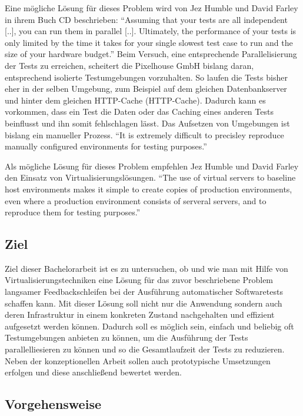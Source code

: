 Eine mögliche Lösung für dieses Problem wird von Jez Humble und David Farley in ihrem Buch \ac{CD} beschrieben: "`Assuming that your tests are all independent [..], you can run them in parallel [..]. Ultimately, the performance of your tests is only limited by the time it takes for your single slowest test case to run and the size of your hardware budget."' \citep[S.][S. 310]{HumFar10} Beim Versuch, eine entsprechende Parallelisierung der Tests zu erreichen, scheitert die Pixelhouse GmbH bislang daran, entsprechend isolierte Testumgebungen vorzuhalten. So laufen die Tests bisher eher in der selben Umgebung, zum Beispiel auf dem gleichen Datenbankserver und hinter dem gleichen HTTP-Cache (\acl{HTTP}-Cache). Dadurch kann es vorkommen, dass ein Test die Daten oder das Caching eines anderen Tests beinflusst und ihn somit fehlschlagen lässt. Das Aufsetzen von Umgebungen ist bislang ein manueller Prozess. "`It is extremely difficult to precisley reproduce manually configured environments for testing purposes."' \citep[S.][S. 49]{HumFar10}

Als mögliche Lösung für dieses Problem empfehlen Jez Humble und David Farley den Einsatz von Virtualisierungslösungen. "`The use of virtual servers to baseline host environments makes it simple to create copies of production environments, even where a production environment consists of serveral servers, and to reproduce them for testing purposes."' \citep[S.][S. 304]{HumFar10}

\subsection{Ziel}

Ziel dieser Bachelorarbeit ist es zu untersuchen, ob und wie man mit Hilfe von Virtualisierungstechniken eine Lösung für das zuvor beschriebene Problem langsamer Feedbackschleifen bei der Ausführung automatischer Softwaretests schaffen kann. Mit dieser Lösung soll nicht nur die Anwendung sondern auch deren Infrastruktur in einem konkreten Zustand nachgehalten und effizient aufgesetzt werden können. Dadurch soll es möglich sein, einfach und beliebig oft Testumgebungen anbieten zu können, um die Ausführung der Tests parallelliesieren zu können und so die Gesamtlaufzeit der Tests zu reduzieren. Neben der konzeptionellen Arbeit sollen auch prototypische Umsetzungen erfolgen und diese anschließend bewertet werden.

\subsection{Vorgehensweise}

